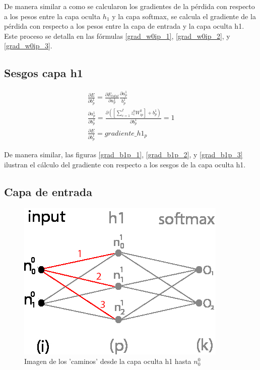 De manera similar a como se calcularon los gradientes de la pérdida con respecto a los pesos entre la capa oculta $h_1$ y la capa softmax, se calcula el gradiente de la pérdida con respecto a los pesos entre la capa de entrada y la capa oculta h1. Este proceso se detalla en las fórmulas \ref{grad_w0ip_1}, \ref{grad_w0ip_2}, y \ref{grad_w0ip_3}.

\subsection{Sesgos capa h1}

\begin{gather}
	\frac{\partial E}{\partial b^1_p} = \frac{\partial E_{total} }{\partial a^1_p }   \frac{\partial a^1_p}{b^1_p} \label{grad_b1p_1} \\
	\frac{\partial a^1_p }{\partial b^1_p } = \frac{\partial ([\sum_{c=1}^{I} z^0_c   W^0_{ip}] + b^1_p) }{\partial b^1_p } = 1 \label{grad_b1p_2} \\
	\frac{\partial E}{\partial b^1_p} = gradiente\_h1_p
	\label{grad_b1p_3}
\end{gather}

De manera similar, las figuras \ref{grad_b1p_1}, \ref{grad_b1p_2}, y \ref{grad_b1p_3} ilustran el cálculo del gradiente con respecto a los sesgos de la capa oculta h1.

\subsection{Capa de entrada}

\begin{figure}[H]
	\centering
	\includegraphics[scale=0.35]{imagenes/nn_caminos_posibles_input.jpg}  
	\caption{Imagen de los 'caminos' desde la capa oculta h1 hasta $n^0_0$}
	\label{nn_caminos_posibles_input}
\end{figure}

